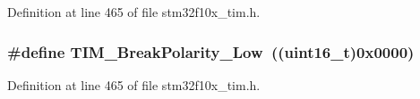 Definition at line 465 of file stm32f10x\+\_\+tim.\+h.

\subsubsection[{\texorpdfstring{T\+I\+M\+\_\+\+Break\+Polarity\+\_\+\+Low}{TIM_BreakPolarity_Low}}]{\setlength{\rightskip}{0pt plus 5cm}\#define T\+I\+M\+\_\+\+Break\+Polarity\+\_\+\+Low~(({\bf uint16\+\_\+t})0x0000)}\hypertarget{group___break___polarity_ga565656ca81d17f9a1807afe3971dff6e}{}\label{group___break___polarity_ga565656ca81d17f9a1807afe3971dff6e}


Definition at line 465 of file stm32f10x\+\_\+tim.\+h.

